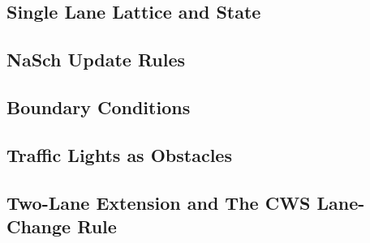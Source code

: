 \subsection{Single Lane Lattice and State}

\subsection{NaSch Update Rules}

\subsection{Boundary Conditions}

\subsection{Traffic Lights as Obstacles}

\subsection{Two-Lane Extension and The CWS Lane-Change Rule}


